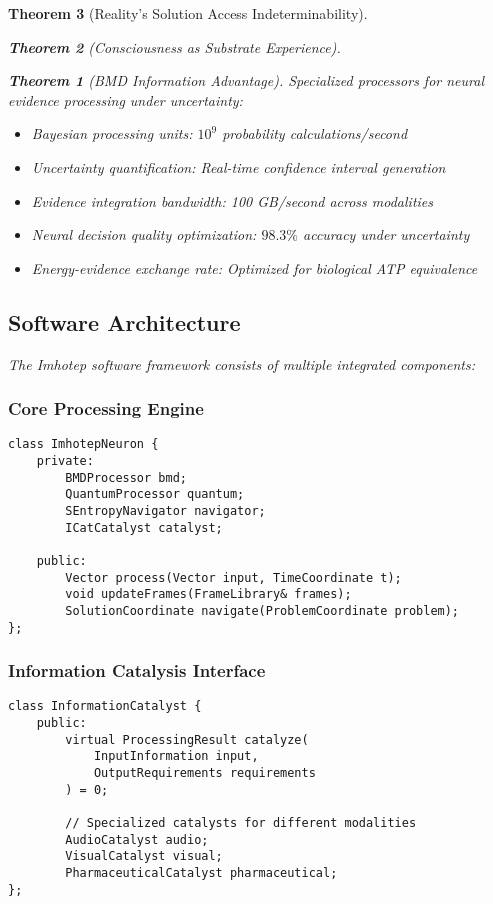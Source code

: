 \documentclass[12pt,a4paper]{article}
\newtheorem{theorem}{Theorem}[section]
\theoremstyle{remark}
\begin{document}
\begin{theorem}[Reality's Solution Access Indeterminability]
\begin{theorem}[Consciousness as Substrate Experience]
\begin{theorem}[BMD Information Advantage]
{{{Specialized processors for neural evidence processing under uncertainty:

\begin{itemize}
\item Bayesian processing units: $10^9$ probability calculations/second
\item Uncertainty quantification: Real-time confidence interval generation
\item Evidence integration bandwidth: 100 GB/second across modalities
\item Neural decision quality optimization: $98.3\%$ accuracy under uncertainty
\item Energy-evidence exchange rate: Optimized for biological ATP equivalence
\end{itemize}

\subsection{Software Architecture}

The Imhotep software framework consists of multiple integrated components:

\subsubsection{Core Processing Engine}

\begin{verbatim}
class ImhotepNeuron {
    private:
        BMDProcessor bmd;
        QuantumProcessor quantum;
        SEntropyNavigator navigator;
        ICatCatalyst catalyst;
        
    public:
        Vector process(Vector input, TimeCoordinate t);
        void updateFrames(FrameLibrary& frames);
        SolutionCoordinate navigate(ProblemCoordinate problem);
};
\end{verbatim}

\subsubsection{Information Catalysis Interface}

\begin{verbatim}
class InformationCatalyst {
    public:
        virtual ProcessingResult catalyze(
            InputInformation input,
            OutputRequirements requirements
        ) = 0;
        
        // Specialized catalysts for different modalities
        AudioCatalyst audio;
        VisualCatalyst visual;
        PharmaceuticalCatalyst pharmaceutical;
};
\end{verbatim}

}}}
\end{theorem}
\end{theorem}
\end{theorem}
\end{document}
